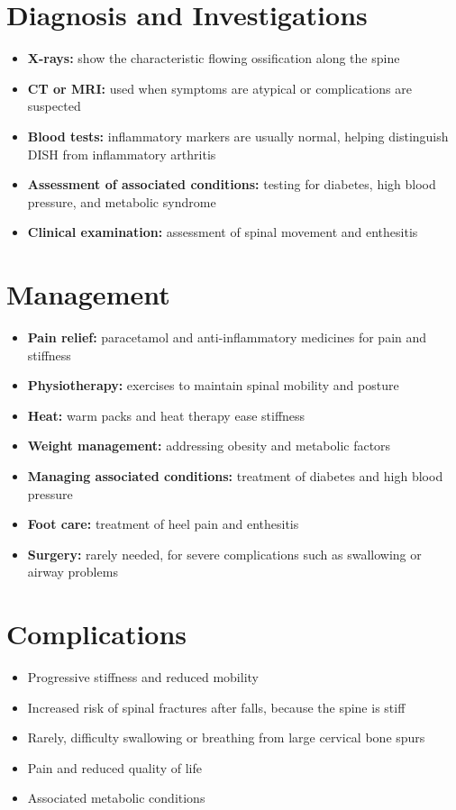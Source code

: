 \section*{Diagnosis and Investigations}
\begin{itemize}
    \item \textbf{X-rays:} show the characteristic flowing ossification along the spine
    \item \textbf{CT or MRI:} used when symptoms are atypical or complications are suspected
    \item \textbf{Blood tests:} inflammatory markers are usually normal, helping distinguish DISH from inflammatory arthritis
    \item \textbf{Assessment of associated conditions:} testing for diabetes, high blood pressure, and metabolic syndrome
    \item \textbf{Clinical examination:} assessment of spinal movement and enthesitis
\end{itemize}

\section*{Management}
\begin{itemize}
    \item \textbf{Pain relief:} paracetamol and anti-inflammatory medicines for pain and stiffness
    \item \textbf{Physiotherapy:} exercises to maintain spinal mobility and posture
    \item \textbf{Heat:} warm packs and heat therapy ease stiffness
    \item \textbf{Weight management:} addressing obesity and metabolic factors
    \item \textbf{Managing associated conditions:} treatment of diabetes and high blood pressure
    \item \textbf{Foot care:} treatment of heel pain and enthesitis
    \item \textbf{Surgery:} rarely needed, for severe complications such as swallowing or airway problems
\end{itemize}

\section*{Complications}
\begin{itemize}
    \item Progressive stiffness and reduced mobility
    \item Increased risk of spinal fractures after falls, because the spine is stiff
    \item Rarely, difficulty swallowing or breathing from large cervical bone spurs
    \item Pain and reduced quality of life
    \item Associated metabolic conditions
\end{itemize}

